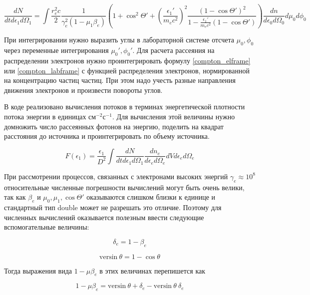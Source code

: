 \begin{equation}\label{compton_labframe}
\frac{dN}{dt d\epsilon_1 d\Omega_1}=\int \frac{r_e^2 c}{2} \frac{1}{\gamma_e^2(1-\mu_1\beta_e)} \left(1 + \cos^2\Theta'+\left(\frac{\epsilon_1'}{m_e c^2}\right)^2\frac{(1-\cos\Theta')^2}{1-\frac{\epsilon_1'}{m_e c^2}(1 - \cos \Theta')}\right)\frac{dn}{d\epsilon_0 d\Omega_0}d\mu_0 d\phi_0
\end{equation}

При интегрировании нужно выразить углы в лабораторной системе отсчета $\mu_0, \phi_0$ через переменные интегрирования $\mu_0', \phi_0'$. Для расчета рассеяния на распределении электронов нужно проинтегрировать формулу \ref{compton_elframe} или \ref{compton_labframe} с функцией распределения электронов, нормированной на концентрацию частиц частиц. При этом надо учесть разные направления движения электронов и произвести повороты углов.

В коде реализовано вычисления потоков в терминах энергетической плотности потока энергии в единицах $\textbf{см}^{-2}\textbf{с}^{-1}$. Для вычисления этой величины нужно домножить число рассеянных фотонов на энергию, поделить на квадрат расстояния до источника и проинтегрировать по объему источника.

\begin{equation}\label{comtonKlein}
F(\epsilon_1)=\frac{\epsilon_1}{D^2}\int \frac{dN}{dt d\epsilon_1 d\Omega_1} \frac{dn_e}{d\epsilon_e d\Omega_e} dV d\epsilon_e d\Omega_e
\end{equation}

При рассмотрении процессов, связанных с электронами высоких энергий $\gamma_e \approx 10^8$ относительные численные погрешности вычислений могут быть очень велики, так как $\beta_e$ и $\mu_0, \mu_1, \cos \Theta'$ оказываются слишком близки к единице и стандартный тип double может не разрешать это отличие. Поэтому для численных вычислений оказывается полезным ввести следующие вспомогательные величины:

\begin{equation}
	\delta_e = 1 - \beta_e
\end{equation}

\begin{equation}
	\text{versin}~\theta = 1 - \cos \theta
\end{equation}

Тогда выражения вида $1 - \mu \beta_e$ в этих величинах перепишется как

\begin{equation}
	1 - \mu \beta_e =\text{versin}~\theta + \delta_e - \text{versin}~\theta~\delta_e
\end{equation}

